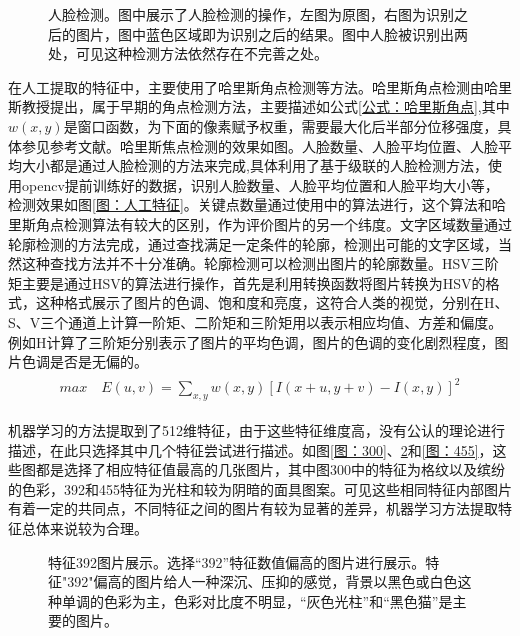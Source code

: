 \documentclass{article}
\begin{document}
\begin{figure}[!htbp]
	\centering
	\subfigure[原图]{\texttt{[image: 人脸-原图]}}
	\subfigure[操作后]{\texttt{[image: 人脸-操作]}}
	\caption{人脸检测。图中展示了人脸检测的操作，左图为原图，右图为识别之后的图片，图中蓝色区域即为识别之后的结果。图中人脸被识别出两处，可见这种检测方法依然存在不完善之处。}
	\label{图：人工特征2}
\end{figure}
\par 在人工提取的特征中，主要使用了哈里斯角点检测等方法。哈里斯角点检测由哈里斯教授提出，属于早期的角点检测方法，主要描述如公式\ref{公式：哈里斯角点},其中$w(x,y)$是窗口函数，为下面的像素赋予权重，需要最大化后半部分位移强度，具体参见参考文献\cite{哈里斯角点}。哈里斯焦点检测的效果如图。人脸数量、人脸平均位置、人脸平均大小都是通过人脸检测的方法来完成,具体利用了基于级联的人脸检测方法，使用opencv提前训练好的数据\cite{opencv2022Jan}，识别人脸数量、人脸平均位置和人脸平均大小等，检测效果如图\ref{图：人工特征}。关键点数量通过使用\cite{starkeypoint2008}中的算法进行，这个算法和哈里斯角点检测算法有较大的区别，作为评价图片的另一个纬度。文字区域数量通过轮廓检测的方法完成，通过查找满足一定条件的轮廓，检测出可能的文字区域，当然这种查找方法并不十分准确。轮廓检测可以检测出图片的轮廓数量。HSV三阶矩主要是通过HSV的算法进行操作，首先是利用转换函数将图片转换为HSV的格式，这种格式展示了图片的色调、饱和度和亮度，这符合人类的视觉，分别在H、S、V三个通道上计算一阶矩、二阶矩和三阶矩用以表示相应均值、方差和偏度。例如H计算了三阶矩分别表示了图片的平均色调，图片的色调的变化剧烈程度，图片色调是否是无偏的。
\begin{align}
	\begin{split}
		max \quad	E(u,v)=\sum_{x,y}w(x,y)\left[I(x+u,y+v)-I(x,y)\right]^2
	\end{split}
	\label{公式：哈里斯角点}
\end{align}
\par 机器学习的方法提取到了512维特征，由于这些特征维度高，没有公认的理论进行描述，在此只选择其中几个特征尝试进行描述。如图\ref{图：300}、\ref{图：392}和\ref{图：455}，这些图都是选择了相应特征值最高的几张图片，其中图300中的特征为格纹以及缤纷的色彩，392和455特征为光柱和较为阴暗的面具图案。可见这些相同特征内部图片有着一定的共同点，不同特征之间的图片有较为显著的差异，机器学习方法提取特征总体来说较为合理。
\begin{figure}[!h]
	\centering
	\subfigure{\texttt{[image: 392-1]}}
	\subfigure{\texttt{[image: 392-2]}}
	\subfigure{\texttt{[image: 392-3]}}
	\subfigure{\texttt{[image: 392-4]}}
	\subfigure{\texttt{[image: 392-5]}}
	\subfigure{\texttt{[image: 392-6]}}
	\caption{特征392图片展示。选择“392”特征数值偏高的图片进行展示。特征"392"偏高的图片给人一种深沉、压抑的感觉，背景以黑色或白色这种单调的色彩为主，色彩对比度不明显，“灰色光柱”和“黑色猫”是主要的图片。}
	\label{图：392}
\end{figure}
\end{document}
